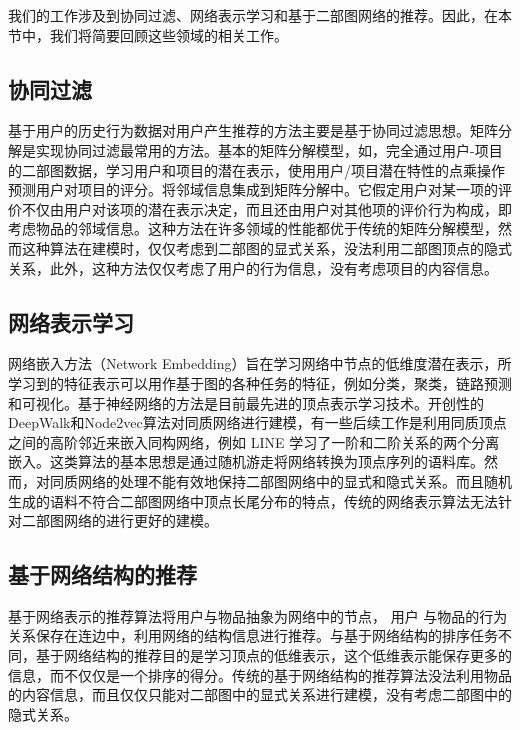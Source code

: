 \documentclass[lang=cn,11pt]{elegantpaper}
\begin{document}
我们的工作涉及到协同过滤、网络表示学习和基于二部图网络的推荐。因此，在本节中，我们将简要回顾这些领域的相关工作。

\subsection{协同过滤}

基于用户的历史行为数据对用户产生推荐的方法主要是基于协同过滤思想\cite{Su2009}。矩阵分解是实现协同过滤最常用的方法。基本的矩阵分解模型，如\cite{Salakhutdinov2007,Koren2009}，完全通过用户-项目的二部图数据，学习用户和项目的潜在表示，使用用户/项目潜在特性的点乘操作预测用户对项目的评分。\cite{Koren2008}将邻域信息集成到矩阵分解中。它假定用户对某一项的评价不仅由用户对该项的潜在表示决定，而且还由用户对其他项的评价行为构成，即考虑物品的邻域信息。这种方法在许多领域的性能都优于传统的矩阵分解模型，然而这种算法在建模时，仅仅考虑到二部图的显式关系，没法利用二部图顶点的隐式关系，此外，这种方法仅仅考虑了用户的行为信息，没有考虑项目的内容信息。

\subsection{网络表示学习}

网络嵌入方法（Network Embedding）旨在学习网络中节点的低维度潜在表示，所学习到的特征表示可以用作基于图的各种任务的特征，例如分类，聚类，链路预测和可视化。基于神经网络的方法是目前最先进的顶点表示学习技术。开创性的DeepWalk\cite{Perozzi2014}和Node2vec\cite{Grover2016}算法对同质网络进行建模，有一些后续工作是利用同质顶点之间的高阶邻近来嵌入同构网络，例如 LINE \cite{Tang2015}学习了一阶和二阶关系的两个分离嵌入。这类算法的基本思想是通过随机游走将网络转换为顶点序列的语料库。然而，对同质网络的处理不能有效地保持二部图网络中的显式和隐式关系。而且随机生成的语料不符合二部图网络中顶点长尾分布的特点，传统的网络表示算法无法针对二部图网络的进行更好的建模。

\subsection{基于网络结构的推荐}

基于网络表示的推荐算法将用户与物品抽象为网络中的节点， 用户
与物品的行为关系保存在连边中，利用网络的结构信息进行推荐\cite{Pongnumkul2018,Liu2009}。与基于网络结构的排序任务不同，基于网络结构的推荐目的是学习顶点的低维表示，这个低维表示能保存更多的信息，而不仅仅是一个排序的得分。传统的基于网络结构的推荐算法没法利用物品的内容信息，而且仅仅只能对二部图中的显式关系进行建模，没有考虑二部图中的隐式关系。
\end{document}
